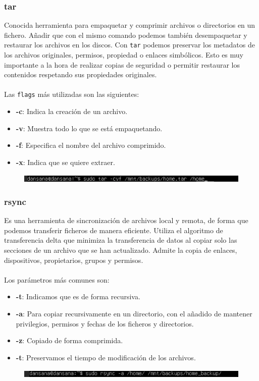 \documentclass[10pt]{article}
\begin{document}
	\subsubsection{tar}
	Conocida herramienta para empaquetar y comprimir archivos o directorios en un fichero. Añadir que con el mismo comando podemos también desempaquetar y restaurar los archivos en los discos. Con \verb|tar| podemos preservar los metadatos de los archivos originales, permisos, propiedad o enlaces simbólicos. Esto es muy importante a la hora de realizar copias de seguridad o permitir restaurar los contenidos respetando sus propiedades originales.\\\\
	Las \verb|flags| más utilizadas son las siguientes:
	\begin{itemize}
		\item \textbf{-c}: Indica la creación de un archivo.
		\item \textbf{-v}: Muestra todo lo que se está empaquetando.
		\item \textbf{-f}: Especifica el nombre del archivo comprimido.
		\item \textbf{-x}: Indica que se quiere extraer. 
	\end{itemize}
	\begin{figure}[H]
		\setlength{\abovecaptionskip}{0cm}
		\setlength{\belowcaptionskip}{0cm}
		\centering
		\includegraphics[width=0.9\linewidth]{Recursos/tar.png}
	\end{figure}
	
	\subsubsection{rsync}
	Es una herramienta de sincronización de archivos local y remota, de forma que podemos transferir ficheros de manera eficiente. Utiliza el algoritmo de transferencia delta que minimiza la transferencia de datos al copiar solo las secciones de un archivo que se han actualizado. Admite la copia de enlaces, dispositivos, propietarios, grupos y permisos.\\\\
	Los parámetros más comunes son:
	\begin{itemize}
		\item \textbf{-t}: Indicamos que es de forma recursiva.
		\item \textbf{-a}: Para copiar recursivamente en un directorio, con el añadido de mantener privilegios, permisos y fechas de los ficheros y directorios.
		\item \textbf{-z}: Copiado de forma comprimida.
		\item \textbf{-t}: Preservamos el tiempo de modificación de los archivos.
	\end{itemize}
	\begin{figure}[H]
		\setlength{\abovecaptionskip}{0cm}
		\setlength{\belowcaptionskip}{0cm}
		\centering
		\includegraphics[width=0.9\linewidth]{Recursos/rsync.png}
	\end{figure}
	\clearpage
	
\end{document}
